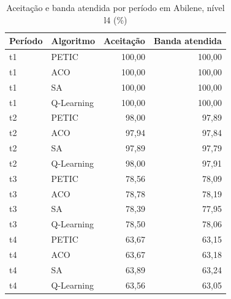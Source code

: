 \begin{table}[htb]
    \centering
    \scriptsize
    \caption{Aceitação e banda atendida por período em Abilene, nível l4 (\%)}
    \label{tab:periodos-abilene-l4}
    \begin{tabular}{llrr}
        \hline
        Período & Algoritmo & Aceitação & Banda atendida \\
        \hline
        t1 & PETIC & 100,00 & 100,00 \\
        t1 & ACO & 100,00 & 100,00 \\
        t1 & SA & 100,00 & 100,00 \\
        t1 & Q-Learning & 100,00 & 100,00 \\
        t2 & PETIC & 98,00 & 97,89 \\
        t2 & ACO & 97,94 & 97,84 \\
        t2 & SA & 97,89 & 97,79 \\
        t2 & Q-Learning & 98,00 & 97,91 \\
        t3 & PETIC & 78,56 & 78,09 \\
        t3 & ACO & 78,78 & 78,19 \\
        t3 & SA & 78,39 & 77,95 \\
        t3 & Q-Learning & 78,50 & 78,06 \\
        t4 & PETIC & 63,67 & 63,15 \\
        t4 & ACO & 63,67 & 63,18 \\
        t4 & SA & 63,89 & 63,24 \\
        t4 & Q-Learning & 63,56 & 63,05 \\
        \hline
    \end{tabular}
\end{table}

